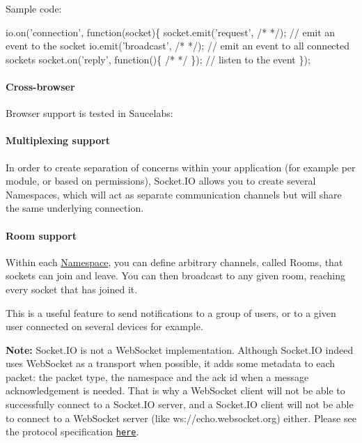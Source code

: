 Sample code\+:


\begin{DoxyCode}
io.on('connection', function(socket)\{
  socket.emit('request', /* */); // emit an event to the socket
  io.emit('broadcast', /* */); // emit an event to all connected sockets
  socket.on('reply', function()\{ /* */ \}); // listen to the event
\});
\end{DoxyCode}


\paragraph*{Cross-\/browser}

Browser support is tested in Saucelabs\+:

\href{https://saucelabs.com/u/socket}{\tt }

\paragraph*{Multiplexing support}

In order to create separation of concerns within your application (for example per module, or based on permissions), Socket.\+IO allows you to create several {\ttfamily Namespaces}, which will act as separate communication channels but will share the same underlying connection.

\paragraph*{Room support}

Within each {\ttfamily \mbox{\hyperlink{struct_namespace}{Namespace}}}, you can define arbitrary channels, called {\ttfamily Rooms}, that sockets can join and leave. You can then broadcast to any given room, reaching every socket that has joined it.

This is a useful feature to send notifications to a group of users, or to a given user connected on several devices for example.

{\bfseries Note\+:} Socket.\+IO is not a Web\+Socket implementation. Although Socket.\+IO indeed uses Web\+Socket as a transport when possible, it adds some metadata to each packet\+: the packet type, the namespace and the ack id when a message acknowledgement is needed. That is why a Web\+Socket client will not be able to successfully connect to a Socket.\+IO server, and a Socket.\+IO client will not be able to connect to a Web\+Socket server (like {\ttfamily ws\+://echo.websocket.\+org}) either. Please see the protocol specification \href{https://github.com/socketio/socket.io-protocol}{\tt here}.

